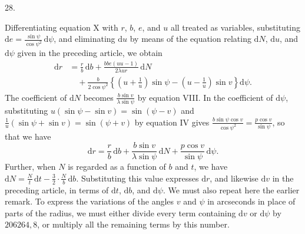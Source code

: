 \par{}
\begin{center}
\hypertarget{native-044-article028}{}28.
\end{center}
Differentiating equation X with $r$, $b$, $e$, and $u$ all treated as variables, substituting $\mathrm{d}e=\frac{\sin\psi}{\cos\psi^2}\,\mathrm{d}\psi$, and eliminating $\mathrm{d}u$ by means of the equation relating $\mathrm{d}N$, $\mathrm{d}u$, and $\mathrm{d}\psi$ given in the preceding article, we obtain
\[
\begin{aligned}
\mathrm{d}r&=\frac{r}{b}\,\mathrm{d}b+\frac{bbe(uu-1)}{2\lambda ur}\,\mathrm{d}N\\
&\quad+\frac{b}{2\cos\psi^2}\left\{\left(u+\frac{1}{u}\right)\sin\psi-\left(u-\frac{1}{u}\right)\sin v\right\}\mathrm{d}\psi.
\end{aligned}
\]
The coefficient of $\mathrm{d}N$ becomes $\frac{b\sin v}{\lambda\sin\psi}$ by equation VIII. In the coefficient of $\mathrm{d}\psi$, substituting $u(\sin\psi-\sin v)=\sin(\psi-v)$ and $\frac{1}{u}(\sin\psi+\sin v)=\sin(\psi+v)$ by equation IV gives $\frac{b\sin\psi\cos v}{\cos\psi^2}=\frac{p\cos v}{\sin\psi}$, so that we have
\[
\mathrm{d}r=\frac{r}{b}\,\mathrm{d}b+\frac{b\sin v}{\lambda\sin\psi}\,\mathrm{d}N+\frac{p\cos v}{\sin\psi}\,\mathrm{d}\psi.
\]
Further, when $N$ is regarded as a function of $b$ and $t$, we have $\mathrm{d}N=\frac{N}{t}\,\mathrm{d}t-\frac{3}{2}\cdot\frac{N}{b}\,\mathrm{d}b$. Substituting this value expresses $\mathrm{d}r$, and likewise $\mathrm{d}v$ in the preceding article, in terms of $\mathrm{d}t$, $\mathrm{d}b$, and $\mathrm{d}\psi$. We must also repeat here the earlier remark. To express the variations of the angles $v$ and $\psi$ in arcseconds in place of parts of the radius, we must either divide every term containing $\mathrm{d}v$ or $\mathrm{d}\psi$ by $206264{,}8$, or multiply all the remaining terms by this number.
